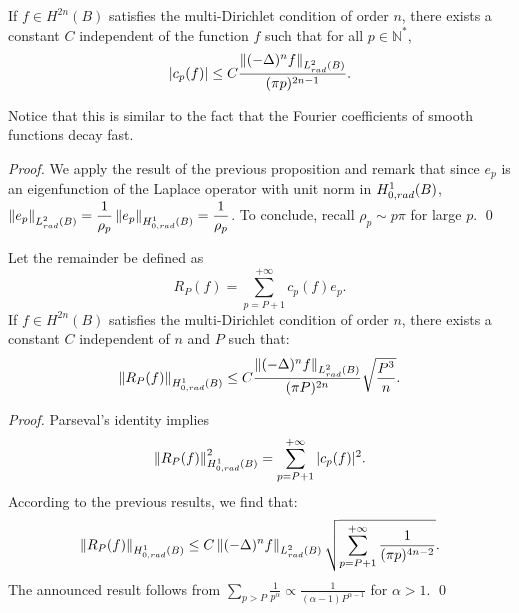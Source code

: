 \documentclass[smallextended]{svjour3}
\begin{document}
\begin{corollary} If $f \in H^{2n}(B)$ satisfies the multi-Dirichlet condition of order $n$, there exists a constant $C$ independent of the function $f$ such that for all $p \in \mathbb{N^*}$, 
	\[ |c_p(f)| \leq  C \dfrac{\left\|(-\Delta)^n f\right\|_{L^2_{rad}(B)}}{(\pi p)^{2n-1}}.\] 
\end{corollary}
\noindent Notice that this is similar to the fact that the Fourier coefficients of smooth functions decay fast. 
\begin{proof}
	We apply the result of the previous proposition and remark that since $e_p$ is an eigenfunction of the Laplace operator with unit norm in $H^1_{0,rad}(B)$, $\left\|e_p\right\|_{L^2_{rad}(B)} = \dfrac{1}{\rho_p}\left\|e_p\right\|_{H^1_{0,rad}(B)} = \dfrac{1}{\rho_p}$. To conclude, recall $\rho_{p} \sim p\pi$ for large $p$.
	\qed
\end{proof}			
\begin{corollary} Let the remainder be defined as 
	\[R_P(f) = \displaystyle\sum_{p = P+1}^{+\infty} c_{p}(f) e_{p}.\]
	If $f \in H^{2n}(B)$ satisfies the multi-Dirichlet condition of order $n$, there exists a constant $C$ independent of $n$ and $P$ such that: 
	\[\left\|R_P(f)\right\|_{H^1_{0,rad}(B)} \leq C\dfrac{\left\|(-\Delta)^n f\right\|_{L^2_{rad}(B)}}{(\pi P)^{2n}}\sqrt{\dfrac{P^3}{n}}.\]
	\label{EstimationRest}
\end{corollary}																												
\begin{proof}
	Parseval's identity implies
	\[\left\|R_P(f)\right\|_{H^1_{0,rad}(B)}^2 = \sum_{p=P+1}^{+\infty}|c_p(f)|^2.\]																																			
	According to the previous results, we find that:
	\[\left\|R_P(f)\right\|_{H^1_{0,rad}(B)} \leq C \left\|(-\Delta)^n f\right\|_{L^2_{rad}(B)}\sqrt{\sum_{p= P+1}^{+\infty} \dfrac{1}{(\pi p)^{4n-2}}}.\]
	The announced result follows from $\displaystyle\sum_{p > P} \frac{1}{p^{\alpha}} \propto \frac{1}{(\alpha - 1)P^{\alpha-1}}$ for $\alpha > 1$. 
	\qed
\end{proof}
										
										
\end{document}
